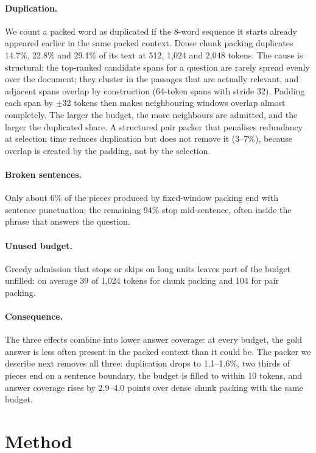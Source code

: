 \documentclass[11pt]{article}
\begin{document}
\paragraph{Duplication.} We count a packed word as duplicated if the 8-word sequence it starts already appeared earlier in the same packed context. Dense chunk packing duplicates 14.7\%, 22.8\% and 29.1\% of its text at 512, 1,024 and 2,048 tokens. The cause is structural: the top-ranked candidate spans for a question are rarely spread evenly over the document; they cluster in the passages that are actually relevant, and adjacent spans overlap by construction (64-token spans with stride 32). Padding each span by $\pm$32 tokens then makes neighbouring windows overlap almost completely. The larger the budget, the more neighbours are admitted, and the larger the duplicated share. A structured pair packer that penalises redundancy at selection time reduces duplication but does not remove it (3--7\%), because overlap is created by the padding, not by the selection.

\paragraph{Broken sentences.} Only about 6\% of the pieces produced by fixed-window packing end with sentence punctuation; the remaining 94\% stop mid-sentence, often inside the phrase that answers the question.

\paragraph{Unused budget.} Greedy admission that stops or skips on long units leaves part of the budget unfilled: on average 39 of 1,024 tokens for chunk packing and 104 for pair packing.

\paragraph{Consequence.} The three effects combine into lower answer coverage: at every budget, the gold answer is less often present in the packed context than it could be. The packer we describe next removes all three: duplication drops to 1.1--1.6\%, two thirds of pieces end on a sentence boundary, the budget is filled to within 10 tokens, and answer coverage rises by 2.9--4.0 points over dense chunk packing with the same budget.

\section{Method}
\label{sec:method}
\end{document}
